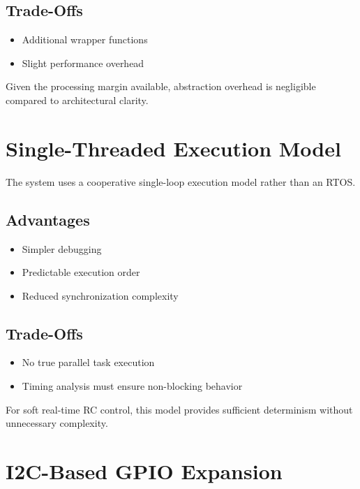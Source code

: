 \subsection{Trade-Offs}

\begin{itemize}
	\item Additional wrapper functions
	\item Slight performance overhead
\end{itemize}

Given the processing margin available, abstraction overhead is negligible compared to architectural clarity.


\section{Single-Threaded Execution Model}

The system uses a cooperative single-loop execution model rather than an RTOS.

\subsection{Advantages}

\begin{itemize}
	\item Simpler debugging
	\item Predictable execution order
	\item Reduced synchronization complexity
\end{itemize}

\subsection{Trade-Offs}

\begin{itemize}
	\item No true parallel task execution
	\item Timing analysis must ensure non-blocking behavior
\end{itemize}

For soft real-time RC control, this model provides sufficient determinism without unnecessary complexity.


\section{I2C-Based GPIO Expansion}

